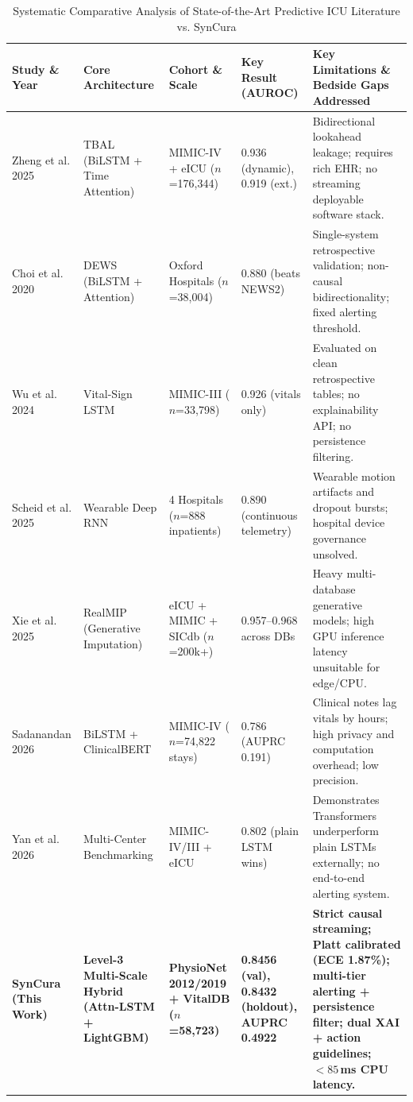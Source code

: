 \documentclass[conference]{IEEEtran}
\begin{document}
\begin{table}[t]
\caption{Systematic Comparative Analysis of State-of-the-Art Predictive ICU Literature vs. SynCura}
\label{tab:lit_comparison}
\centering
\footnotesize
\setlength{\tabcolsep}{4.5pt}
\begin{tabular}{p{2.6cm}p{2.3cm}p{3.2cm}p{2.8cm}p{5.2cm}}
\toprule
\textbf{Study \& Year} & \textbf{Core Architecture} & \textbf{Cohort \& Scale} & \textbf{Key Result (AUROC)} & \textbf{Key Limitations \& Bedside Gaps Addressed} \\
\midrule
Zheng et al. 2025~\cite{zheng2025} & TBAL (BiLSTM + Time Attention) & MIMIC-IV + eICU ($n$=176,344) & 0.936 (dynamic), 0.919 (ext.) & Bidirectional lookahead leakage; requires rich EHR; no streaming deployable software stack. \\
\addlinespace[2pt]
Choi et al. 2020~\cite{choi2020} & DEWS (BiLSTM + Attention) & Oxford Hospitals ($n$=38,004) & 0.880 (beats NEWS2) & Single-system retrospective validation; non-causal bidirectionality; fixed alerting threshold. \\
\addlinespace[2pt]
Wu et al. 2024~\cite{wu2024} & Vital-Sign LSTM & MIMIC-III ($n$=33,798) & 0.926 (vitals only) & Evaluated on clean retrospective tables; no explainability API; no persistence filtering. \\
\addlinespace[2pt]
Scheid et al. 2025~\cite{scheid2025} & Wearable Deep RNN & 4 Hospitals ($n$=888 inpatients) & 0.890 (continuous telemetry) & Wearable motion artifacts and dropout bursts; hospital device governance unsolved. \\
\addlinespace[2pt]
Xie et al. 2025~\cite{xie2025} & RealMIP (Generative Imputation) & eICU + MIMIC + SICdb ($n$=200k+) & 0.957--0.968 across DBs & Heavy multi-database generative models; high GPU inference latency unsuitable for edge/CPU. \\
\addlinespace[2pt]
Sadanandan 2026~\cite{sadanandan2026} & BiLSTM + ClinicalBERT & MIMIC-IV ($n$=74,822 stays) & 0.786 (AUPRC 0.191) & Clinical notes lag vitals by hours; high privacy and computation overhead; low precision. \\
\addlinespace[2pt]
Yan et al. 2026~\cite{yan2026} & Multi-Center Benchmarking & MIMIC-IV/III + eICU & 0.802 (plain LSTM wins) & Demonstrates Transformers underperform plain LSTMs externally; no end-to-end alerting system. \\
\midrule
\textbf{SynCura (This Work)} & \textbf{Level-3 Multi-Scale Hybrid (Attn-LSTM + LightGBM)} & \textbf{PhysioNet 2012/2019 + VitalDB ($n$=58,723)} & \textbf{0.8456 (val), 0.8432 (holdout), AUPRC 0.4922} & \textbf{Strict causal streaming; Platt calibrated (ECE 1.87\%); multi-tier alerting + persistence filter; dual XAI + action guidelines; $<85$\,ms CPU latency.} \\
\bottomrule
\end{tabular}
\end{table}
\end{document}
